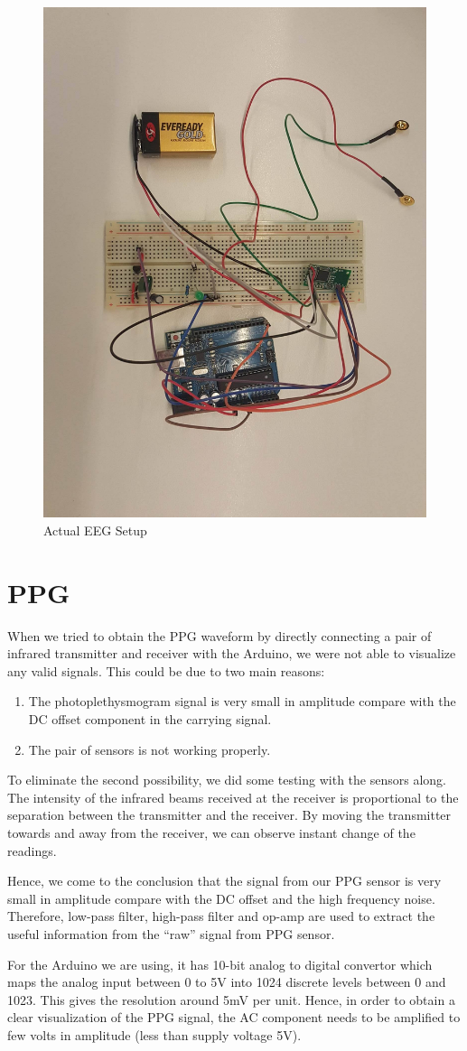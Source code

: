 \begin{figure}[H]
	\centering
	\includegraphics[width=0.4\linewidth,angle=90,origin=c]{eegsetup.jpg}
	\caption{Actual EEG Setup}
\end{figure}

\section{PPG}

When we tried to obtain the PPG waveform by directly connecting a pair of infrared transmitter and receiver with the Arduino, we were not able to visualize any valid signals. This could be due to two main reasons: 

\begin{enumerate}
	\item The photoplethysmogram signal is very small in amplitude compare with the DC offset component in the carrying signal.
	\item The pair of sensors is not working properly.	
\end{enumerate}

To eliminate the second possibility, we did some testing with the sensors along. The intensity of the infrared beams received at the receiver is proportional to the separation between the transmitter and the receiver. By moving the transmitter towards and away from the receiver, we can observe instant change of the readings. 

Hence, we come to the conclusion that the signal from our PPG sensor is very small in amplitude compare with the DC offset and the high frequency noise. Therefore, low-pass filter, high-pass filter and op-amp are used to extract the useful information from the “raw” signal from PPG sensor. 

For the Arduino we are using, it has 10-bit analog to digital convertor which maps the analog input between 0 to 5V into 1024 discrete levels between 0 and 1023. This gives the resolution around 5mV per unit. Hence, in order to obtain a clear visualization of the PPG signal, the AC component needs to be amplified to few volts in amplitude (less than supply voltage 5V). 

